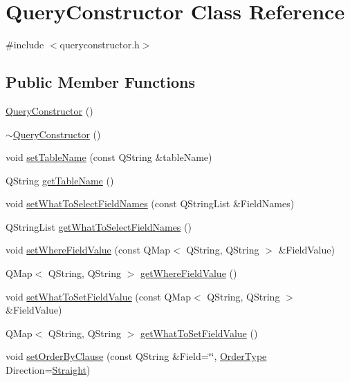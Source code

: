 \hypertarget{classQueryConstructor}{}\section{Query\+Constructor Class Reference}
\label{classQueryConstructor}


{\ttfamily \#include $<$queryconstructor.\+h$>$}

\subsection*{Public Member Functions}
\begin{DoxyCompactItemize}
\item 
\hyperlink{classQueryConstructor_aca25dd3b5f90ea47d12603839f9e5fa1}{Query\+Constructor} ()
\item 
\hyperlink{classQueryConstructor_a36ee5259fb3d02aed7001969280d1f41}{$\sim$\+Query\+Constructor} ()
\item 
void \hyperlink{classQueryConstructor_ad1b13fbc7d8c55e384c992852f755008}{set\+Table\+Name} (const Q\+String \&table\+Name)
\item 
Q\+String \hyperlink{classQueryConstructor_ab15e51c0e2017f03136de1e67d8ba97b}{get\+Table\+Name} ()
\item 
void \hyperlink{classQueryConstructor_ae9b5ac08342f01185d0ecc941b882a76}{set\+What\+To\+Select\+Field\+Names} (const Q\+String\+List \&Field\+Names)
\item 
Q\+String\+List \hyperlink{classQueryConstructor_af5d3d02ae4bb5cbc734dd857e43e6248}{get\+What\+To\+Select\+Field\+Names} ()
\item 
void \hyperlink{classQueryConstructor_a304819b8f851385fa6925cc273ccc94d}{set\+Where\+Field\+Value} (const Q\+Map$<$ Q\+String, Q\+String $>$ \&Field\+Value)
\item 
Q\+Map$<$ Q\+String, Q\+String $>$ \hyperlink{classQueryConstructor_a0633e6811dc4b75555dc9519b2df4115}{get\+Where\+Field\+Value} ()
\item 
void \hyperlink{classQueryConstructor_a969ca6d0c1d258f8a6e6f587f545c2d2}{set\+What\+To\+Set\+Field\+Value} (const Q\+Map$<$ Q\+String, Q\+String $>$ \&Field\+Value)
\item 
Q\+Map$<$ Q\+String, Q\+String $>$ \hyperlink{classQueryConstructor_a9bd4099539666a1c62e8f4eda9b051f1}{get\+What\+To\+Set\+Field\+Value} ()
\item 
void \hyperlink{classQueryConstructor_a096ed5c85c40851db92a7f45405df4cd}{set\+Order\+By\+Clause} (const Q\+String \&Field=\char`\"{}\char`\"{}, \hyperlink{queryconstructor_8h_a57124e387290311f33f3b54a54930418}{Order\+Type} Direction=\hyperlink{queryconstructor_8h_a57124e387290311f33f3b54a54930418ada4cdade2120d083fe09b30940e51c12}{Straight})

\end{DoxyCompactItemize}
